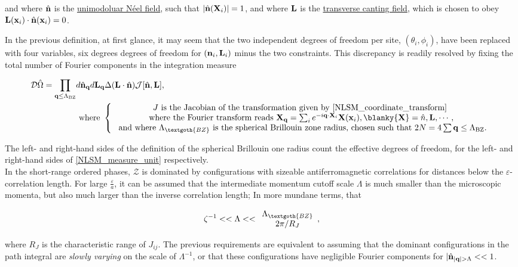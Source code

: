 and where $\hat{{\bf n}}$ is the \underline{unimodoluar Néel field}, such that $|\hat{{\bf n}}({\bf X}_i)| =1$, and where ${\bf L}$ is the \underline{transverse canting field}, which is chosen to obey ${\bf L}({\bf x}_i) \cdot \hat{{\bf n}}({\bf x}_i) = 0$. 

In the previous definition, at first glance, it may seem that the two independent degrees of freedom per site, $(\theta_i, \phi_i)$, have been replaced with four variables, six degrees degrees of freedom for $({\bf n}_i , {\bf L}_i)$
minus the two constraints. This discrepancy is readily resolved by fixing the total number of Fourier components in the integration measure

\begin{equation}
\begin{split}
    \mathcal{D} \hat{\Omega} = \prod_{{\bf q} \leq \Lambda_{\textnormal{BZ}}} &d\hat{\bf n}_{{\bf q}} d{\bf L}_{{\bf q}} \Delta({\bf L} \cdot \hat{\bf n}) \mathcal{J}[\hat{\bf n}, {\bf L}], \\
    &\textnormal{ where } \left\{ \begin{array}{cc}
             \textnormal{$J$ is the Jacobian of the transformation given by \cref{NLSM_coordinate_transform} } \\ 
             \textnormal{where the Fourier transform reads } 
             {\bf X}_{{\bf q}} = \sum_{i} e^{-i {\bf q}\cdot{\bf X}_i} {\bf X}({\bf x}_i), \blanky {\bf X} = \hat{n}, {\bf L}, \cdots, \\
             \textnormal{ and where $\Lambda_{\textgoth{BZ}}$ is the spherical Brillouin zone radius, chosen such that } 
             2N = 4 \sum{{\bf q} \leq \Lambda_{\textnormal{BZ}}}.
    \end{array}\right.
    \label{NLSM_measure_unit}
\end{split}
\end{equation}

The left- and right-hand sides of the definition of the spherical Brillouin one radius count the effective degrees of freedom, for the left- and right-hand sides of \cref{NLSM_measure_unit} respectively. \\

In the short-range ordered phases, $\mathcal{Z}$ is dominated by configurations with sizeable antiferromagnetic correlations for distances below the $\varepsilon$-correlation length. For large $\frac{\varepsilon}{a}$, it can be assumed that the intermediate momentum cutoff scale $\Lambda$ is much smaller than the microscopic momenta, but also much larger than the inverse correlation length; In more mundane terms, that

$$
    \zeta^{-1} << \Lambda << \begin{array}{cc}
         \Lambda_{\textgoth{BZ}} \\
         {2\pi}/{R_J}
    \end{array},
$$

where $R_J$ is the characteristic range of $J_{ij}$. The previous requirements are equivalent to assuming that the dominant configurations in the path integral are \textit{slowly varying} on the scale of $\Lambda^{-1}$, or that these configurations have negligible Fourier components for $|\hat{\bf n}_{|{\bf q}| > \Lambda} << 1$. 
